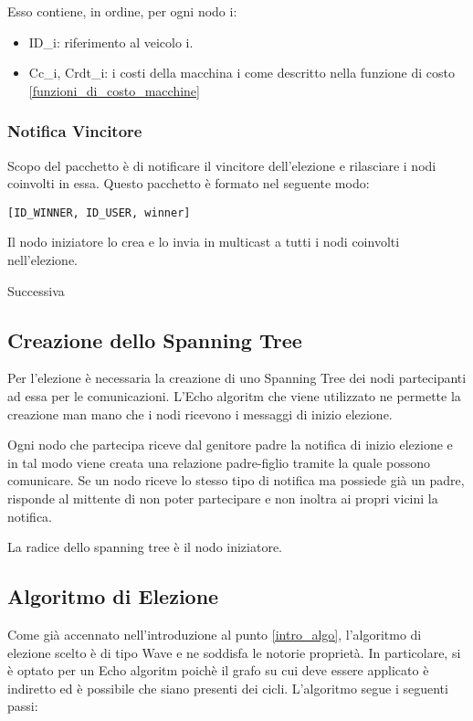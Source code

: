 Esso contiene, in ordine, per ogni nodo i: 
\begin{itemize}
	\item ID\_i: riferimento al veicolo i.
	\item Cc\_i, Crdt\_i: i costi della macchina i come descritto nella funzione di costo \ref{funzioni_di_costo_macchine}
\end{itemize}

\subsubsection{Notifica Vincitore}\label{pacchetto_vincitore}
Scopo del pacchetto è di notificare il vincitore dell'elezione e rilasciare i nodi coinvolti in essa. Questo pacchetto è formato nel seguente modo:

\begin{lstlisting}
[ID_WINNER, ID_USER, winner]
\end{lstlisting}

Il nodo iniziatore lo crea e lo invia in multicast a tutti i nodi coinvolti nell'elezione.

Successiva

\subsection{Creazione dello Spanning Tree}

Per l'elezione è necessaria la creazione di uno Spanning Tree dei nodi partecipanti ad essa per le comunicazioni. L'Echo algoritm che viene utilizzato ne permette la creazione man mano che i nodi ricevono i messaggi di inizio elezione.

Ogni nodo che partecipa riceve dal genitore padre la notifica di inizio elezione e in tal modo viene creata una relazione padre-figlio tramite la quale possono comunicare. Se un nodo riceve lo stesso tipo di notifica ma possiede già un padre, risponde al mittente di non poter partecipare e non inoltra ai propri vicini la notifica.

La radice dello spanning tree è il nodo iniziatore.

\subsection{Algoritmo di Elezione}

Come già accennato nell'introduzione al punto \ref{intro_algo}, l'algoritmo di elezione scelto è di tipo Wave e ne soddisfa le notorie proprietà. In particolare, si è optato per un Echo algoritm poichè il grafo su cui deve essere applicato è indiretto ed è possibile che siano presenti dei cicli.
L'algoritmo segue i seguenti passi:

